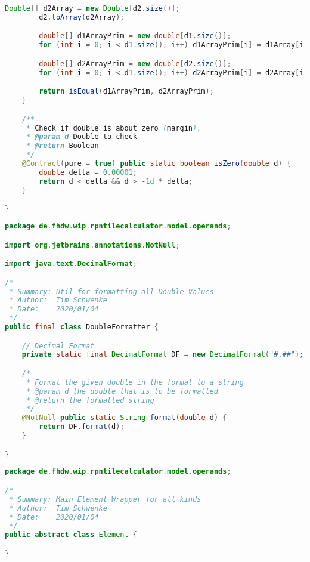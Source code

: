 \begin{lstlisting}[caption=DoubleComparator (Schwenke),label=list:DoubleComparator,language=Java]
        Double[] d2Array = new Double[d2.size()];
        d2.toArray(d2Array);

        double[] d1ArrayPrim = new double[d1.size()];
        for (int i = 0; i < d1.size(); i++) d1ArrayPrim[i] = d1Array[i];

        double[] d2ArrayPrim = new double[d2.size()];
        for (int i = 0; i < d1.size(); i++) d2ArrayPrim[i] = d2Array[i];

        return isEqual(d1ArrayPrim, d2ArrayPrim);
    }

    /**
     * Check if double is about zero (margin).
     * @param d Double to check
     * @return Boolean
     */
    @Contract(pure = true) public static boolean isZero(double d) {
        double delta = 0.00001;
        return d < delta && d > -1d * delta;
    }

}
\end{lstlisting}    

\begin{lstlisting}[caption=DoubleFormatter (Schwenke),label=list:DoubleFormatter,language=Java]
package de.fhdw.wip.rpntilecalculator.model.operands;

import org.jetbrains.annotations.NotNull;

import java.text.DecimalFormat;

/*
 * Summary: Util for formatting all Double Values
 * Author:  Tim Schwenke
 * Date:    2020/01/04
 */
public final class DoubleFormatter {

    // Decimal Format
    private static final DecimalFormat DF = new DecimalFormat("#.##");

    /*
     * Format the given double in the format to a string
     * @param d the double that is to be formatted
     * @return the formatted string
     */
    @NotNull public static String format(double d) {
        return DF.format(d);
    }

}

\end{lstlisting} 

\begin{lstlisting}[caption=Element (Schwenke),label=list:Element,language=Java]
package de.fhdw.wip.rpntilecalculator.model.operands;

/*
 * Summary: Main Element Wrapper for all kinds
 * Author:  Tim Schwenke
 * Date:    2020/01/04
 */
public abstract class Element {

}
\end{lstlisting}    

